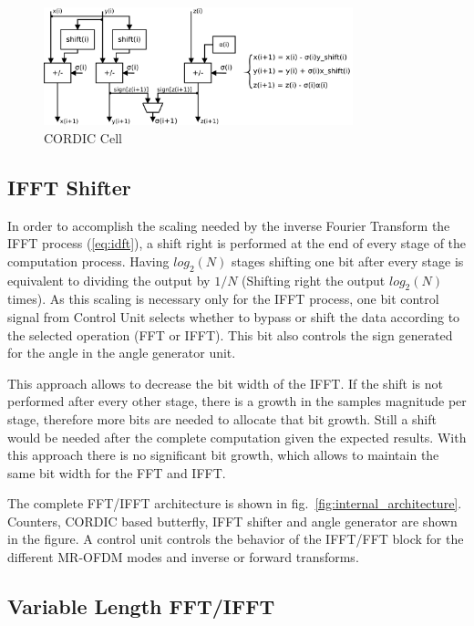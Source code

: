 \begin{figure}[htb!]
\centering
\includegraphics[width=0.8\textwidth]{./figures/cordic_cell_v2.pdf}
\vspace{-0.2 cm}
\caption{CORDIC Cell}
\label{fig:cordic_architecture}
\end{figure}




\subsection{IFFT Shifter}

In order to accomplish the scaling needed by the inverse Fourier Transform the IFFT process (\ref{eq:idft}), 
a shift right is performed at the end of every stage of the computation process. Having 
$log_2(N)$ stages shifting one bit after every stage is equivalent to dividing 
the output by $1/N$ (Shifting right the output $log_2(N)$ times). As this scaling is 
necessary only for the IFFT process, one bit 
control signal from Control Unit selects whether to bypass or shift the data according 
to the selected operation (FFT or IFFT). This bit also controls the sign generated for the angle in the angle generator unit.

This approach allows to  decrease the bit width of the IFFT. If the shift is not performed after every other stage, there is a growth in the samples magnitude per stage, therefore more bits are needed to allocate that bit growth. Still a shift would be needed after the complete computation given the expected results. With this approach there is no significant bit growth, which allows  to maintain the same bit width for the FFT and IFFT.

The complete FFT/IFFT architecture is shown in fig.~\ref{fig:internal_architecture}. Counters, CORDIC based butterfly, IFFT shifter  and angle generator are shown in the figure.  A control unit controls the behavior of the IFFT/FFT block for the  different MR-OFDM modes and inverse or forward transforms. 

\subsection{Variable Length FFT/IFFT}

